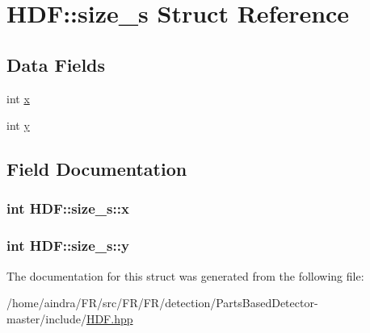 \hypertarget{structHDF_1_1size__s}{\section{\-H\-D\-F\-:\-:size\-\_\-s \-Struct \-Reference}
\label{structHDF_1_1size__s}
}
\subsection*{\-Data \-Fields}
\begin{DoxyCompactItemize}
\item 
int \hyperlink{structHDF_1_1size__s_a409eafbca9a18aa873cd58c5694de025}{x}
\item 
int \hyperlink{structHDF_1_1size__s_aaf73b7c42bedbd634b3ae567eb4fad2a}{y}
\end{DoxyCompactItemize}


\subsection{\-Field \-Documentation}
\hypertarget{structHDF_1_1size__s_a409eafbca9a18aa873cd58c5694de025}{
\subsubsection[{x}]{\setlength{\rightskip}{0pt plus 5cm}int {\bf \-H\-D\-F\-::size\-\_\-s\-::x}}}\label{structHDF_1_1size__s_a409eafbca9a18aa873cd58c5694de025}
\hypertarget{structHDF_1_1size__s_aaf73b7c42bedbd634b3ae567eb4fad2a}{
\subsubsection[{y}]{\setlength{\rightskip}{0pt plus 5cm}int {\bf \-H\-D\-F\-::size\-\_\-s\-::y}}}\label{structHDF_1_1size__s_aaf73b7c42bedbd634b3ae567eb4fad2a}


\-The documentation for this struct was generated from the following file\-:\begin{DoxyCompactItemize}
\item 
/home/aindra/\-F\-R/src/\-F\-R/\-F\-R/detection/\-Parts\-Based\-Detector-\/master/include/\hyperlink{HDF_8hpp}{\-H\-D\-F.\-hpp}\end{DoxyCompactItemize}
